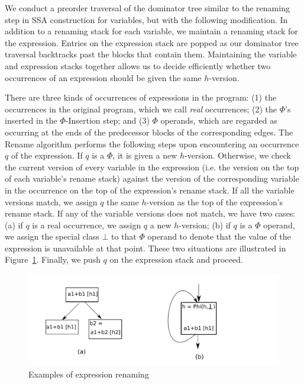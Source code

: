 We conduct a preorder traversal of the dominator tree similar to the renaming
step in SSA construction for variables, but with the following modification.
In addition to a renaming stack for each variable, we
maintain a renaming stack for the expression. Entries on the expression
stack are popped as our dominator tree traversal backtracks past the
blocks that contain them.  Maintaining the variable and expression stacks
together allows us to decide efficiently whether two occurrences of an
expression should be given the same $h$-version.

There are three kinds of occurrences of expressions in the program:
(1) the occurrences in the original program, which we call \emph{real}
occurrences; (2) the $\Phi$'s inserted in the $\Phi$-Insertion step; and
(3) $\Phi$ operands, which are regarded as occurring at the ends of the
predecessor blocks of the corresponding edges.  The Rename algorithm
performs the following steps upon encountering an occurrence $q$ of the
expression.  If $q$ is a $\Phi$, it is given a new $h$-version.  Otherwise,
we check the current version of every variable in the expression (i.e. the
version on the top of each variable's rename stack) against the version of
the corresponding variable in the occurrence on the top of the expression's
rename stack.  If all the variable versions match, we assign $q$ the same
$h$-version as the top of the expression's rename stack.  If any of the 
variable versions does not match, we have two cases: (a) if $q$ is a real
occurrence, we assign $q$ a new $h$-version; (b) if $q$ is a $\Phi$ operand,
we assign the special class $\bot$ to that $\Phi$ operand to denote that
the value of the expression is unavailable at that point.  These two
situations are illustrated in Figure~\ref{fig: rename}.  Finally, we push
$q$ on the expression stack and proceed.

\begin{figure}
\centering
\includegraphics[scale=0.55]{fig-rename.pdf}
\caption{Examples of expression renaming}
\label{fig: rename}
\end{figure}

